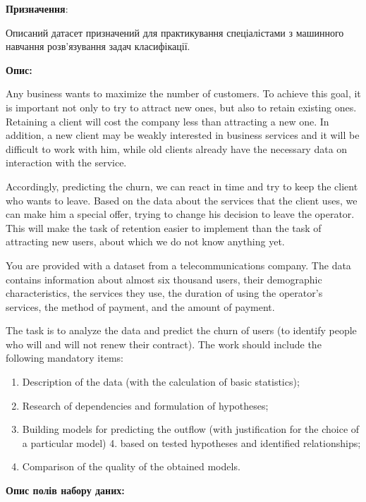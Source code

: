 \documentclass[
]{book}
\providecommand{\tightlist}{%
  \setlength{\itemsep}{0pt}\setlength{\parskip}{0pt}}
\begin{document}
\textbf{Призначення}:

Описаний датасет призначений для практикування спеціалістами з машинного навчання розв'язування задач класифікації.

\textbf{Опис:}

Any business wants to maximize the number of customers. To achieve this goal, it is important not only to try to attract new ones, but also to retain existing ones. Retaining a client will cost the company less than attracting a new one. In addition, a new client may be weakly interested in business services and it will be difficult to work with him, while old clients already have the necessary data on interaction with the service.

Accordingly, predicting the churn, we can react in time and try to keep the client who wants to leave. Based on the data about the services that the client uses, we can make him a special offer, trying to change his decision to leave the operator. This will make the task of retention easier to implement than the task of attracting new users, about which we do not know anything yet.

You are provided with a dataset from a telecommunications company. The data contains information about almost six thousand users, their demographic characteristics, the services they use, the duration of using the operator's services, the method of payment, and the amount of payment.

The task is to analyze the data and predict the churn of users (to identify people who will and will not renew their contract). The work should include the following mandatory items:

\begin{enumerate}
\def\labelenumi{\arabic{enumi}.}
\tightlist
\item
  Description of the data (with the calculation of basic statistics);
\item
  Research of dependencies and formulation of hypotheses;
\item
  Building models for predicting the outflow (with justification for the choice of a particular model) 4. based on tested hypotheses and identified relationships;
\item
  Comparison of the quality of the obtained models.
\end{enumerate}

\textbf{Опис полів набору даних:}
\end{document}
